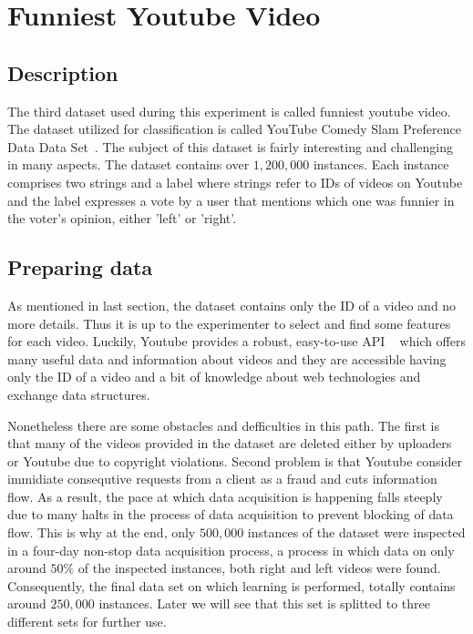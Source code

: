 \section{Funniest Youtube Video}
\label{db:sec:ds3}
\subsection{Description}

The third dataset used during this experiment is called funniest youtube video.
The dataset utilized for classification is called YouTube Comedy Slam Preference
Data Data Set~\cite{ds3:uci}. The subject of this dataset is fairly interesting and
challenging in many aspects. The dataset contains over $1,200,000$ 
instances. Each instance comprises two strings and a label where strings
refer to IDs of videos on Youtube and the label expresses a vote by a
user that mentions which one was funnier in the voter's opinion, either 'left'
or 'right'.

\subsection{Preparing data}

As mentioned in last section, the dataset contains only the ID of a video and no
more details. Thus it is up to the experimenter to select and find some features
for each video. Luckily, Youtube provides a robust, easy-to-use API
~\cite{youtubeapi} which offers many useful data and information about videos and they are accessible having
only the ID of a video and a bit of knowledge about web technologies and
exchange data structures. 

Nonetheless there are some obstacles and defficulties
in this path. The first is that many of the videos provided in the
dataset are deleted either by uploaders or Youtube due to copyright violations.
Second problem is that Youtube consider immidiate consequtive requests from a
client as a fraud and cuts information flow. As a result, the pace at which data
acquisition is happening falls steeply due to many halts in the process of
data acquisition to prevent blocking of data flow. This is why at the end, only
$500,000$ instances of the dataset were inspected in a four-day non-stop data
acquisition process, a process in which data on only around $50\%$ of the
inspected instances, both right and left videos were found. Consequently, the
final data set on which learning is performed, totally contains around $250,000$
instances. Later we will see that this set is splitted to three different sets
for further use.

